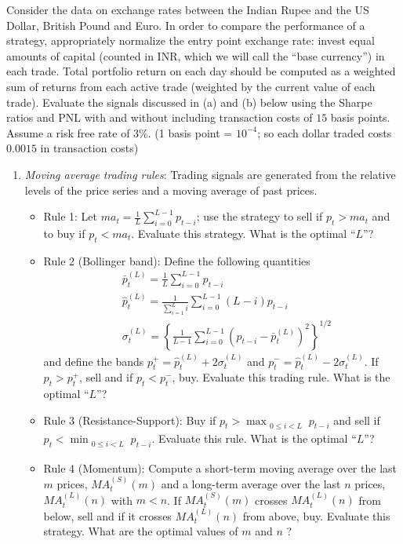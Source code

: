 \documentclass[12pt]{article}
\begin{document}
\begin{enumerate}
Consider the data on exchange rates between the Indian Rupee and the US Dollar, British Pound and Euro. In order to compare the performance of a strategy, appropriately normalize the entry point exchange rate: invest equal amounts of capital (counted in INR, which we will call the ``base currency'') in each trade. Total portfolio return on each day should be computed as a weighted sum of returns from each active trade (weighted by the current value of each trade). Evaluate the signals discussed in (a) and (b) below using the Sharpe ratios and PNL with and without including transaction costs of $15$ basis points. Assume a risk free rate of $3\%$. (1 basis point = $10^{-4}$; so each dollar traded costs $0.0015$ in transaction costs)
\begin{enumerate}
\item{\it Moving average trading rules}: Trading signals are generated from the relative levels of the price series and a moving average of past prices.
\begin{itemize}
\item  Rule 1: Let $ma_t = \frac{1}{L}\sum_{i=0}^{L-1}p_{t-i}$; use the strategy to sell if $p_t > ma_t$ and to buy if $p_t<ma_t$. Evaluate this strategy. What is the optimal ``$L$''? 
\item Rule 2 (Bollinger band): Define the following quantities
\begin{align*}
&\bar p_t^{(L)} = \frac{1}{L}\sum_{i=0}^{L-1}p_{t-i}\\
&\hat p_t^{(L)} = \frac{1}{\sum_{i=1}^{L}i}\sum_{i=0}^{L-1}(L-i)p_{t-i}\\
&\sigma_t^{(L)} = \left\{\frac{1}{L-1}\sum_{i=0}^{L-1}\left(p_{t-i}-\bar p_t^{(L)}\right)^2\right\}^{1/2}
\end{align*}
and define the bands $p_t^+ = \hat p_t^{(L)} + 2\sigma_t^{(L)}$ and $p_t^- = \hat p_t^{(L)} - 2\sigma_t^{(L)}$. If $p_t>p_t^+$, sell and if $p_t<p_t^-$, buy. Evaluate this trading rule. What is the optimal ``$L$''?
\item Rule 3 (Resistance-Support): Buy if $p_t > \max_{\substack{0\le i< L}}p_{t-i}$ and sell if $p_t < \min_{\substack{0\le i< L}}p_{t-i}$. Evaluate this rule. What is the optimal ``$L$''?
\item Rule 4 (Momentum): Compute a short-term moving average over the last $m$ prices, $MA^{(S)}_t(m)$ and a long-term average over the last $n$ prices, $MA^{(L)}_t(n)$ with $m<n$. If $MA^{(S)}_t(m)$ crosses $MA^{(L)}_t(n)$ from below, sell and if it crosses $MA^{(L)}_t(n)$ from above, buy. Evaluate this strategy. What are the optimal values of $m$ and $n$ ?

\end{itemize}
\end{enumerate}
\end{enumerate}
\end{document}
